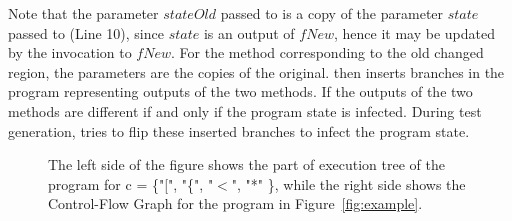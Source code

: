 Note that the parameter $stateOld$ passed to 
 is a copy of the parameter $state$ passed to  (Line 10), since $state$ is an output of $fNew$, hence it may be updated by the invocation to $fNew$. 
For the method corresponding to the old changed region, the parameters are the copies of the original.
 then inserts branches in the program representing outputs of the two methods.
If the outputs of the two methods are different if and only if the program state is infected.
During test generation,  tries to flip these inserted branches to infect the program state.
\begin{figure}[t]
    \centering
         \hspace{2cm}
    \vspace{-0.4cm}
    \caption{\scriptsize{The left side of the figure shows the part of execution tree of the program for c = \{"[", "\{", "$<$", "*" \}, while the right side shows the Control-Flow Graph for the program in Figure~\ref{fig:example}.}}
    \vspace{-1.1cm}
    \label{fig:Tree}
    \end{figure}
